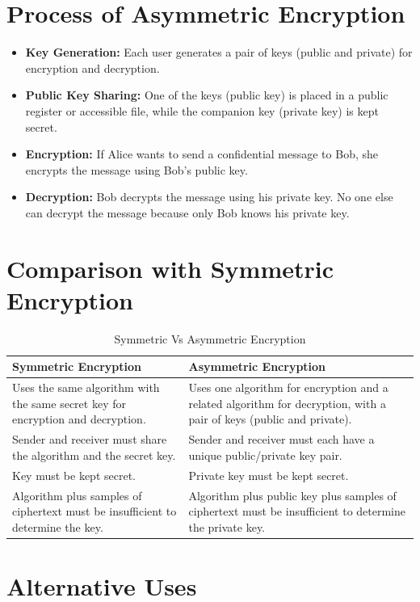 \section{Process of Asymmetric Encryption}

\begin{itemize}
    \item \textbf{Key Generation:} Each user generates a pair of keys (public and private) for encryption and decryption.
    \item \textbf{Public Key Sharing:} One of the keys (public key) is placed in a public register or accessible file, while the companion key (private key) is kept secret.
    \item \textbf{Encryption:} If Alice wants to send a confidential message to Bob, she encrypts the message using Bob’s public key.
    \item \textbf{Decryption:} Bob decrypts the message using his private key. No one else can decrypt the message because only Bob knows his private key.
\end{itemize}

\section{Comparison with Symmetric Encryption}
\begin{table}[ht!]
    \centering
\begin{tabular}{|p{6.5cm}|p{6.5cm}|}
\hline
\textbf{Symmetric Encryption} & \textbf{Asymmetric Encryption} \\
\hline
Uses the same algorithm with the same secret key for encryption and decryption. & Uses one algorithm for encryption and a related algorithm for decryption, with a pair of keys (public and private). \\
\hline
Sender and receiver must share the algorithm and the secret key. & Sender and receiver must each have a unique public/private key pair. \\
\hline
Key must be kept secret. & Private key must be kept secret. \\
\hline
Algorithm plus samples of ciphertext must be insufficient to determine the key. & Algorithm plus public key plus samples of ciphertext must be insufficient to determine the private key. \\
\hline
\end{tabular}
\caption{Symmetric Vs Asymmetric Encryption}
\end{table}
\section{Alternative Uses}

